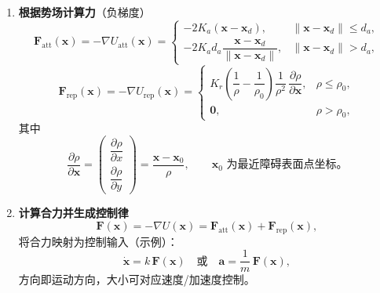 \documentclass[../main.tex]{subfiles}
\begin{document}
\begin{enumerate}
\begin{itemize}
\begin{enumerate}
                    \item \textbf{根据势场计算力}（负梯度）
                    \[
                    \mathbf{F}_{\mathrm{att}}(\mathbf{x}) = -\nabla U_{\mathrm{att}}(\mathbf{x}) =
                    \begin{cases}
                        -2K_a(\mathbf{x}-\mathbf{x}_d), & \lVert \mathbf{x}-\mathbf{x}_d\rVert \le d_a,\\[6pt]
                        -2K_a d_a \dfrac{\mathbf{x}-\mathbf{x}_d}{\lVert \mathbf{x}-\mathbf{x}_d\rVert}, & \lVert \mathbf{x}-\mathbf{x}_d\rVert > d_a,
                    \end{cases}
                    \]
                    \[
                    \mathbf{F}_{\mathrm{rep}}(\mathbf{x}) = -\nabla U_{\mathrm{rep}}(\mathbf{x}) =
                    \begin{cases}
                        K_r\!\left(\dfrac{1}{\rho}-\dfrac{1}{\rho_0}\right)\!\dfrac{1}{\rho^{2}}\,\dfrac{\partial \rho}{\partial \mathbf{x}}, & \rho \le \rho_0,\\[10pt]
                        \mathbf{0}, & \rho > \rho_0,
                    \end{cases}
                    \]
                    其中
                    \[
                    \dfrac{\partial \rho}{\partial \mathbf{x}}
                    =\begin{pmatrix}\dfrac{\partial \rho}{\partial x}\\[2pt]\dfrac{\partial \rho}{\partial y}\end{pmatrix}
                    = \dfrac{\mathbf{x}-\mathbf{x}_0}{\rho},\qquad
                    \mathbf{x}_0 \text{ 为最近障碍表面点坐标。}
                    \]
                
                    \item \textbf{计算合力并生成控制律}
                    \[
                    \mathbf{F}(\mathbf{x}) = -\nabla U(\mathbf{x}) 
                    = \mathbf{F}_{\mathrm{att}}(\mathbf{x}) + \mathbf{F}_{\mathrm{rep}}(\mathbf{x}),
                    \]
                    将合力映射为控制输入（示例）：
                    \[
                    \dot{\mathbf{x}} = k\,\mathbf{F}(\mathbf{x}) 
                    \quad \text{或} \quad 
                    \mathbf{a} = \frac{1}{m}\,\mathbf{F}(\mathbf{x}),
                    \]
                    方向即运动方向，大小可对应速度/加速度控制。
                \end{enumerate}


\end{itemize}
\end{enumerate}
\end{document}
